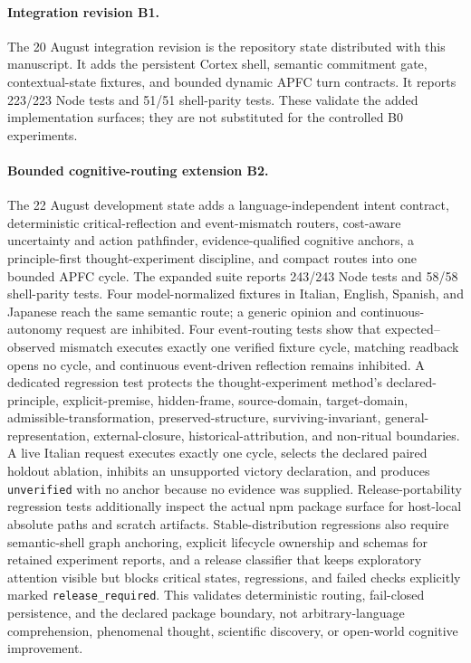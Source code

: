 \documentclass[10pt,twocolumn]{article}
\theoremstyle{definition}
\theoremstyle{plain}
\theoremstyle{remark}
\newcommand{\file}[1]{\nolinkurl{#1}}
\newcommand{\baseline}{\textsf{B0}}
\newcommand{\revision}{\textsf{B1}}
\newcommand{\cognitive}{\textsf{B2}}
\begin{document}
\paragraph{Integration revision \revision.}
The 20 August integration revision is the repository state distributed with this manuscript. It adds the persistent Cortex shell, semantic commitment gate, contextual-state fixtures, and bounded dynamic APFC turn contracts. It reports 223/223 Node tests and 51/51 shell-parity tests.  These validate the added implementation surfaces; they are not substituted for the controlled \baseline{} experiments.

\paragraph{Bounded cognitive-routing extension \cognitive.}
The 22 August development state adds a language-independent intent contract, deterministic critical-reflection and event-mismatch routers, cost-aware uncertainty and action pathfinder, evidence-qualified cognitive anchors, a principle-first thought-experiment discipline, and compact routes into one bounded APFC cycle.  The expanded suite reports 243/243 Node tests and 58/58 shell-parity tests.  Four model-normalized fixtures in Italian, English, Spanish, and Japanese reach the same semantic route; a generic opinion and continuous-autonomy request are inhibited.  Four event-routing tests show that expected--observed mismatch executes exactly one verified fixture cycle, matching readback opens no cycle, and continuous event-driven reflection remains inhibited.  A dedicated regression test protects the thought-experiment method's declared-principle, explicit-premise, hidden-frame, source-domain, target-domain, admissible-transformation, preserved-structure, surviving-invariant, general-representation, external-closure, historical-attribution, and non-ritual boundaries.  A live Italian request executes exactly one cycle, selects the declared paired holdout ablation, inhibits an unsupported victory declaration, and produces \file{unverified} with no anchor because no evidence was supplied.  Release-portability regression tests additionally inspect the actual npm package surface for host-local absolute paths and scratch artifacts.  Stable-distribution regressions also require semantic-shell graph anchoring, explicit lifecycle ownership and schemas for retained experiment reports, and a release classifier that keeps exploratory attention visible but blocks critical states, regressions, and failed checks explicitly marked \file{release\_required}.
  This validates deterministic routing, fail-closed persistence, and the declared package boundary, not arbitrary-language comprehension, phenomenal thought, scientific discovery, or open-world cognitive improvement.
\end{document}
